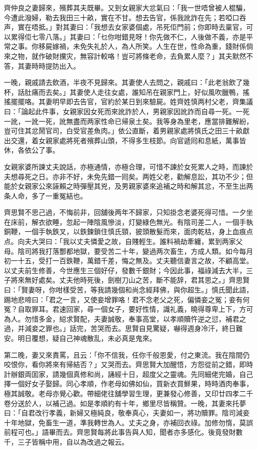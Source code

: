 \documentclass[a5paper, 12pt, openany]{book} %
\begin{document}
	齊仲良之妻歸來，殯葬其夫既畢。又到女親家大忿氣曰：「我一世唔曾被人棍騙，今遭此潑婦，勒去我田三十畝，實在不甘。想去告官，係我訛詐在先；若啞口吞声，實在唔抵。」對其妻曰：「我想去女家婆個處，吊死佢門前；你即時去稟官，可以累得佢七零八落。」其妻曰：「乜你咁錯見呀！你先做不仁，人後做不義，亦是平常之事。你移屍嫁禍，未免失礼於人，為人所笑。人生在世，性命為重，錢財係倘來之物，就作破財攩灾，無容計較咯！豈可將條老命，去負累人麼？」其夫默然不答，其妻時時提防出入。

	一晚，親戚請去飲酒，半夜不見歸來。其妻使人去問之，親戚曰：「此老翁飲了幾杯，話肚痛而去矣。」其妻使人走往女處，誰知吊在親家門上，好似風吹臘鴨，搖搖擺擺咯。其妻明早即去告官，官約於某日到來驗屍。姓齊姓慎两村父老，齊集議曰：「論起此件事，女親家因女死而來訛詐於人，男親家因訛詐而自尋一死。一死一訛，一訛一死，訛無盡而两家性命已帰泉土矣。我等身為里老，應當排難解紛，豈可住其忿鬧官司，白受官差魚肉。」依公直斷，着男親家處將慎氏之田三十畝獻出交還，着女親家處將死者殯葬山頭，不得多生枝節。向官遞囘和息紙，萬事皆休，各依公了事。

	女親家婆所諫丈夫說話，亦極通情，亦極合理，可惜不諫於女死累人之時，而諫於夫想尋死之日。亦非不好，未免先錯一囘矣。两姓父老，勸解息訟，其功不少；但能於女親家公來誣賴之時彈壓其兇，及男親家婆來追補之時和解其忿，不至生出两条人命，多了一重冤結也。

	齊思賢不思己過，不悔前非，回舖後两年不歸家，只知掛念老婆死得可惜。一夕坐在床前，解衣欲睡，忽起一陣陰風慘淡，灯變綠色無光。有陰司差二人，一個手執銅鞭，一個手執鉄叉，以鉄鍊鎖住慎氏頸，披頭散髮而來，面肉乾枯，身上血痕点点。向夫大哭曰：「我以丈夫憐愛之故，自賤輕生。誰料禍劫牽纏，累到两家父母。陰司將我打落酆都地獄，要受苦二十年，變過两次畜生，方成人類。如今每月初一十五，受打一百鉄鞭，萬錯千差，悔之無及。丈夫聽信妻言之故，不顧高堂。以丈夫前生修善，今世應生三個好仔，發數千銀財；今因此事，福祿減去大半，三子將來無好處矣。丈夫他時死後，劍樹刀山之苦，斷不能辞，君其思之。」齊思賢曰：「賢妻呀，你咁樣受苦，等我請幾個和尚念經拜佛，與你超生。」慎氏聞此語，踢地悲啼曰：「君之一言，又使妾增罪咯！君不念老父之死，偏憐妾之冤；妾有何冤？自取罪耳。君速回家，尋一個女子，要好性情，識礼義，曉得尊卑上下，方可為人。勿惜多金，縂求賢配，夫妻誠敬，奉事高堂，以孝順贖忤逆之愆，補君之過，并減妾之罪也。」話完，苦哭而去。思賢自見驚疑，嚇得週身冷汗，終日難安。明日覆想，疑自己神魂散乱，未必真是鬼來。

	第二晚，妻又來責罵，且云：「你不信我，任你千般恩愛，付之東流。我在陰間仍咬恨你，看你將來有帰結否？」又哭而去。齊思賢大加醒悟，方怨從前之錯，即時計辦銀両囬家，請幾個真修和尚，誦經十日，超度父之靈魂。先同細佬完婚，自己擇一個好女子娶歸。同心孝順，作老母如佛如仙，買新衣買鮮果，時時酒肉奉事，極其誠敬。老母亦覺心歡。帶細佬往舖學習生理，更兼發心修善，又印廿四孝二千卷分送於人，以補己過。如是孝順約有十年，鄉里尽皆稱贊。一晚，其妻來托夢曰：「自君改行孝義，新婦又極純良，敬奉真心，夫妻如一，將功贖罪。陰司減妾十年地獄，免畜生一道，準我轉世為人。丈夫之身，亦補回衣祿。加修勿惰，莫誤前程可也。」語畢而去。齊思賢每將此事告與人知，聞者亦多感化。後竟發財數千，三子皆稱中用，自以為改過之報云。
\end{document}
